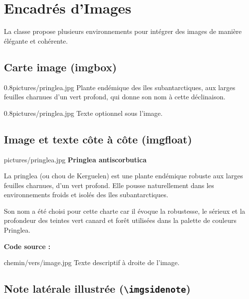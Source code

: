 \documentclass[theme=pringlea]{myrtille}
\begin{document}
\section{Encadrés d'Images}
La classe propose plusieurs environnements pour intégrer des images de manière élégante et cohérente.

\subsection{Carte image (imgbox)}
\begin{imgbox}{0.8\linewidth}{pictures/pringlea.jpg}
    Plante endémique des îles subantarctiques, aux larges feuilles charnues d'un vert profond, qui donne son nom à cette déclinaison.
\end{imgbox}

\begin{texblock}
\begin{imgbox}{0.8\linewidth}{pictures/pringlea.jpg}
Texte optionnel sous l'image.
\end{imgbox}
\end{texblock}

\subsection{Image et texte côte à côte (imgfloat)}
\begin{imgfloat}{pictures/pringlea.jpg}
  \textbf{Pringlea antiscorbutica}

  La pringlea (ou chou de Kerguelen) est une plante endémique robuste aux larges feuilles charnues, d'un vert profond. Elle pousse naturellement dans les environnements froids et isolés des îles subantarctiques.

  \vspace{4pt}
  Son nom a été choisi pour cette charte car il évoque la robustesse, le sérieux et la profondeur des teintes vert canard et forêt utilisées dans la palette de couleurs Pringlea.
\end{imgfloat}

\textbf{Code source :}
\begin{texblock}
\begin{imgfloat}{chemin/vers/image.jpg}
  Texte descriptif à droite de l'image.
\end{imgfloat}
\end{texblock}

\subsection{Note latérale illustrée (\texttt{\textbackslash imgsidenote})}
\end{document}
